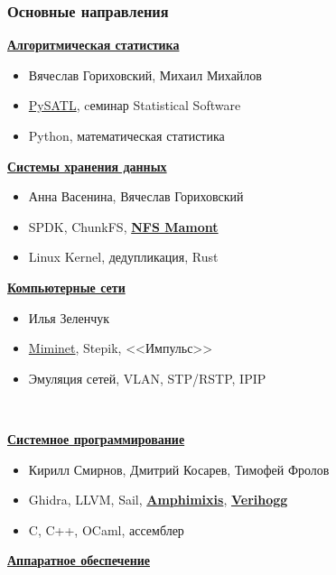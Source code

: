 \documentclass[xcolor=table,aspectratio=169]{beamer}
\begin{document}
\begin{frame}[fragile]
  \frametitle{Основные направления}
    \begin{minipage}{0.48\textwidth}
        \underline{\textbf{Алгоритмическая статистика}}
        \small{
        \begin{itemize}\setlength\itemsep{-0.4em}
          \item Вячеслав Гориховский, Михаил Михайлов
          \item \href{https://github.com/PySATL/}{PySATL}, cеминар Statistical Software
          \item Python, математическая статистика
        \end{itemize}
        }
        \underline{\textbf{ Системы хранения данных}}
        \small{
        \begin{itemize}\setlength\itemsep{-0.4em}
          \item Анна Васенина, Вячеслав Гориховский
          \item SPDK, ChunkFS, \textbf{\href{https://github.com/RMamonts/nfs-mamont}{NFS Mamont}}
          \item Linux Kernel, дедупликация, Rust
        \end{itemize}
        }
        \underline{\textbf{Компьютерные сети}}
        \small{
        \begin{itemize}\setlength\itemsep{-0.4em}
          \item Илья Зеленчук
          \item \href{https://github.com/mimi-net/miminet}{Miminet}, Stepik, <<Импульс>>
          \item Эмуляция сетей, VLAN, STP/RSTP, IPIP
        \end{itemize}
        }
    \end{minipage}~  
    \begin{minipage}{0.48\textwidth}
      \underline{\textbf{Системное программирование}}
      \small{
        \begin{itemize}\setlength\itemsep{-0.4em}
          \item Кирилл Смирнов, Дмитрий Косарев, Тимофей Фролов
          \item Ghidra, LLVM, Sail, \textbf{\href{https://github.com/Amphimixis/amphimixis}{Amphimixis}}, \textbf{\href{https://github.com/verihogg}{Verihogg}}
          \item C, C++, OCaml, ассемблер
        \end{itemize}
      }
        \underline{\textbf{Аппаратное обеспечение}}
        \small{
}
\end{minipage}
\end{frame}
\end{document}
